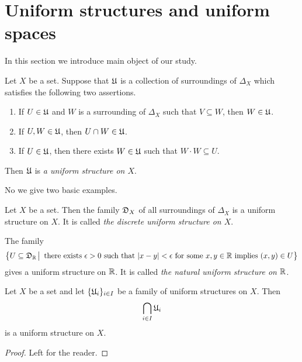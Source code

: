 \section{Uniform structures and uniform spaces}
\noindent
In this section we introduce main object of our study.

\begin{definition}
Let $X$ be a set. Suppose that ${\mathfrak U}$ is a collection of surroundings of $\Delta_X$ which satisfies the following two assertions.
\begin{enumerate}[label=\textbf{(\arabic*)}, leftmargin=*]
\item If $U \in {\mathfrak U}$ and $W$ is a surrounding of $\Delta_X$ such that $V\subseteq W$, then $W\in {\mathfrak U}$.
\item If $U,W\in {\mathfrak U}$, then $U\cap W \in {\mathfrak U}$. 
\item If $U \in {\mathfrak U}$, then there exists $W\in {\mathfrak U}$ such that $W\cdot W \subseteq U$.
\end{enumerate}
Then ${\mathfrak U}$ is \textit{a uniform structure on $X$}.
\end{definition}
\noindent
No we give two basic examples.

\begin{example}\label{example:discrete_uniform_structure}
Let $X$ be a set. Then the family ${\mathfrak D}_X$ of all surroundings of $\Delta_X$ is a uniform structure on $X$. It is called \textit{the discrete uniform structure on $X$}.
\end{example}

\begin{example}\label{example:uniform_structure_on_reals}
The family
$$\big\{U\subseteq {\mathfrak D}_{{\mathbb R}}\,\big|\,\mbox{ there exists }\epsilon > 0\mbox{ such that }|x - y| < \epsilon\mbox{ for some }x,y\in {\mathbb R}\mbox{ implies }(x,y)\in U\big\}$$
gives a uniform structure on ${\mathbb R}$. It is called \textit{the natural uniform structure on ${\mathbb R}$}.
\end{example}

\begin{fact}\label{fact:uniform_structures_are_closed_under_intersections}
Let $X$ be a set and let $\{{\mathfrak U}_i\}_{i\in I}$ be a family of uniform structures on $X$. Then 
$$\bigcap_{i\in I}{\mathfrak U}_i$$
is a uniform structure on $X$.
\end{fact}
\begin{proof}
Left for the reader.
\end{proof}

